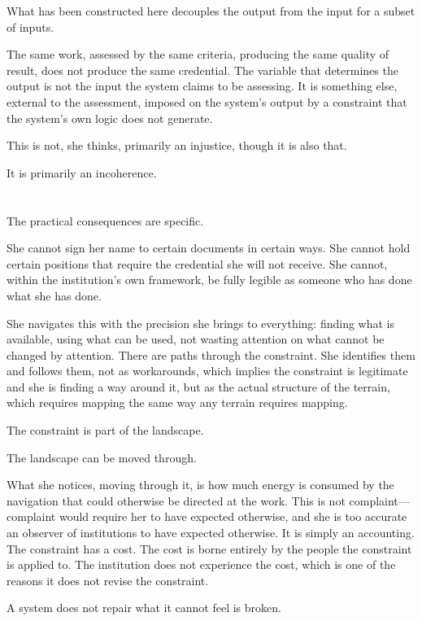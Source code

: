 What has been constructed here decouples the output
from the input for a subset of inputs.

The same work, assessed by the same criteria, producing
the same quality of result, does not produce the same
credential. The variable that determines the output
is not the input the system claims to be assessing.
It is something else, external to the assessment,
imposed on the system's output by a constraint that
the system's own logic does not generate.

This is not, she thinks, primarily an injustice,
though it is also that.

It is primarily an incoherence.

\section{}

The practical consequences are specific.

She cannot sign her name to certain documents in
certain ways. She cannot hold certain positions
that require the credential she will not receive.
She cannot, within the institution's own framework,
be fully legible as someone who has done what she
has done.

She navigates this with the precision she brings
to everything: finding what is available, using
what can be used, not wasting attention on what
cannot be changed by attention. There are paths
through the constraint. She identifies them and
follows them, not as workarounds, which implies
the constraint is legitimate and she is finding
a way around it, but as the actual structure of
the terrain, which requires mapping the same way
any terrain requires mapping.

The constraint is part of the landscape.

The landscape can be moved through.

What she notices, moving through it, is how much
energy is consumed by the navigation that could
otherwise be directed at the work. This is not
complaint---complaint would require her to have
expected otherwise, and she is too accurate an
observer of institutions to have expected otherwise.
It is simply an accounting. The constraint has
a cost. The cost is borne entirely by the people
the constraint is applied to. The institution
does not experience the cost, which is one of
the reasons it does not revise the constraint.

A system does not repair what it cannot feel
is broken.


